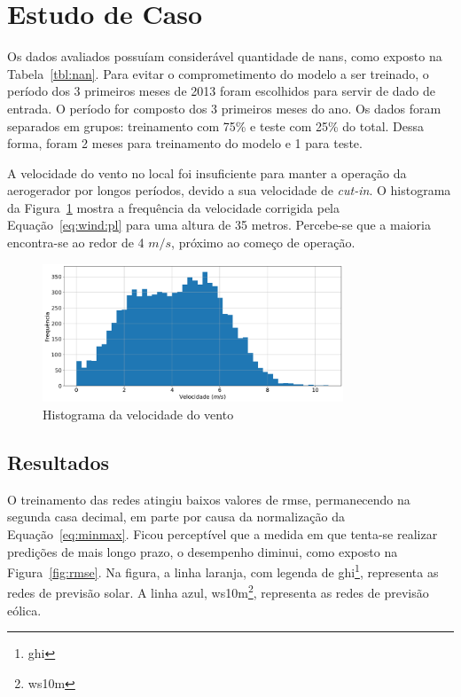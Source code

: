 \clearpage

\section{Estudo de Caso}

Os dados avaliados possuíam considerável quantidade de \acrshort{nan}s, como
exposto na Tabela~\ref{tbl:nan}. Para evitar o comprometimento do modelo a ser
treinado, o período dos 3 primeiros meses de 2013 foram escolhidos para servir
de dado de entrada.  O período for composto dos 3 primeiros meses do ano. Os
dados foram separados em grupos: treinamento com 75\% e teste com 25\% do total.
Dessa forma, foram 2 meses para treinamento do modelo e 1 para teste.



A velocidade do vento no local foi insuficiente para manter a operação da
aerogerador por longos períodos, devido a sua velocidade de \emph{cut-in}. O
histograma da Figura~\ref{fig:hist} mostra a frequência da velocidade corrigida
pela Equação~\ref{eq:wind:pl} para uma altura de 35 metros. Percebe-se que a
maioria encontra-se ao redor de 4 $m/s$, próximo ao começo de operação.

\begin{figure}[ht]
	\centering
	\includegraphics[width=0.8\textwidth]{../img/wind_hist.png}
	\caption{Histograma da velocidade do vento}\label{fig:hist}
\end{figure}

\subsection{Resultados}

O treinamento das redes atingiu baixos valores de \acrshort{rmse}, permanecendo
na segunda casa decimal, em parte por causa da normalização da
Equação~\ref{eq:minmax}. Ficou perceptível que a medida em que tenta-se realizar
predições de mais longo prazo, o desempenho diminui, como exposto na
Figura~\ref{fig:rmse}. Na figura, a linha laranja, com legenda de
\acrshort{ghi}\footnote{\acrlong{ghi}}, representa as redes de previsão solar. A
linha azul, \acrshort{ws10m}\footnote{\acrlong{ws10m}}, representa as redes de
previsão eólica.

